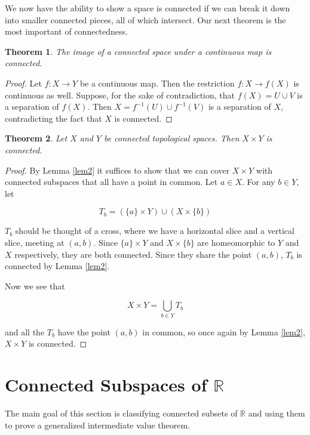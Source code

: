 \documentclass[a4paper]{article}
\newtheorem{theorem}{Theorem}
\numberwithin{theorem}{section}
\begin{document}
We now have the ability to show a space is connected if we can break it down into smaller connected pieces, all of which intersect. Our next theorem is the most important of connectedness.

\begin{theorem}
The image of a connected space under a continuous map is connected.
\end{theorem}
\begin{proof}
Let $f: X \rightarrow Y$ be a continuous map. Then the restriction $f: X \rightarrow f(X)$ is continuous as well. Suppose, for the sake of contradiction, that $f(X) = U \cup V$ is a separation of $f(X)$. Then $X = f^{-1}(U) \cup f^{-1}(V)$ is a separation of $X$, contradicting the fact that $X$ is connected.

\end{proof}


\begin{theorem}
Let $X$ and $Y$ be connected topological spaces. Then $X \times Y$ is connected.
\end{theorem}
\begin{proof}
By Lemma \ref{lem2} it suffices to show that we can cover $X \times Y$ with connected subspaces that all have a point in common. Let $a \in X$. For any $b \in Y$, let 

$$ T_b = (\{a\} \times Y) \cup (X \times \{b\}) $$

$T_b$ should be thought of a cross, where we have a horizontal slice and a vertical slice, meeting at $(a,b)$. Since $\{a\} \times Y$ and $X \times \{b\}$ are homeomorphic to $Y$ and $X$ respectively, they are both connected. Since they share the point $(a,b)$, $T_b$ is connected by Lemma \ref{lem2}. 

Now we see that 

$$ X \times Y = \bigcup_{b \in Y} T_b $$

and all the $T_b$ have the point $(a,b)$ in common, so once again by Lemma \ref{lem2}, $X \times Y$ is connected.

\end{proof}

\section{Connected Subspaces of $\mathbb{R}$}

The main goal of this section is classifying connected subsets of $\mathbb{R}$ and using them to prove a generalized intermediate value theorem.
\end{document}
